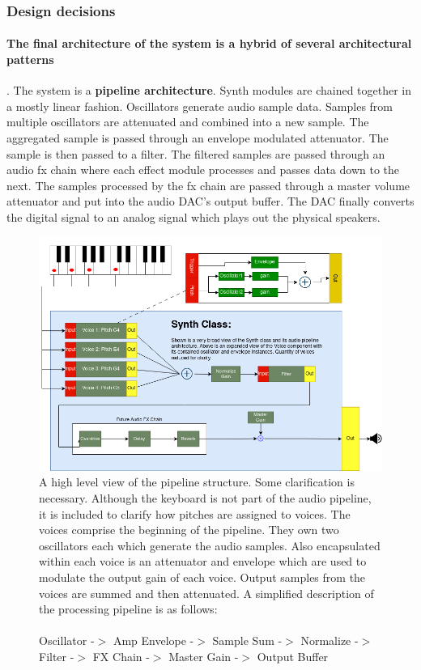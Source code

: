 \documentclass[acmlarge,screen]{acmart}
\begin{document}
	\subsubsection{Design decisions}
	\paragraph{The final architecture of the system is a hybrid of several architectural patterns}. The system is a \textbf{pipeline architecture}. Synth modules are chained together in a mostly linear fashion. Oscillators generate audio sample data. Samples from multiple oscillators are attenuated and combined into a new sample. The aggregated sample is passed through an envelope modulated attenuator. The sample is then passed to a filter. The filtered samples are passed through an audio fx chain where each effect module processes and passes data down to the next. The samples processed by the fx chain are passed through a master volume attenuator and put into the audio DAC's output buffer. The DAC finally converts the digital signal to an analog signal which plays out the physical speakers.
	
	\begin{figure}
		\includegraphics[width=\linewidth]{Synth_Audio_Pipeline}
		\caption{A high level view of the pipeline structure. Some clarification is necessary. Although the keyboard is not part of the audio pipeline, it is included to clarify how pitches are assigned to voices. The voices comprise the beginning of the pipeline. They own two oscillators each which generate the audio samples. Also encapsulated within each voice is an attenuator and envelope which are used to modulate the output gain of each voice. Output samples from the voices are summed and then attenuated. A simplified description of the processing pipeline is as follows:\\\\ Oscillator -$>$ Amp Envelope -$>$ Sample Sum -$>$ Normalize -$>$ Filter -$>$ FX Chain -$>$ Master Gain -$>$ Output Buffer }
	\end{figure}
	
\end{document}

